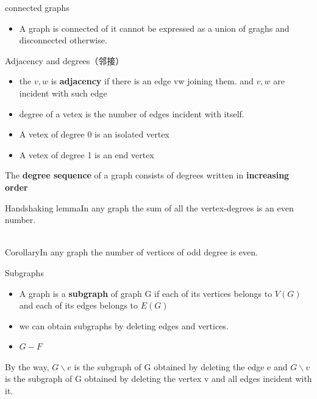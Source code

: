 \documentclass[12pt,a4paper]{ctexart}
\begin{document}
\begin{center}
    \colorbox{mygrey}{\color{myred}connected graphs}
    \begin{itemize}
        \item A graph is connected of it cannot be expressed as a union of graghs and disconnected otherwise.
    \end{itemize}
\end{center}

\begin{center}
    \colorbox{mygrey}{\color{myred}Adjacency and degrees（邻接）}
    \begin{itemize}
        \item the $v,w$ is \textbf{adjacency} if there is an edge vw joining them. and $v,w$ are incident with such edge
        \item degree of a vetex is the number of edges incident with itself.
        \item A vetex of degree 0 is an isolated vertex 
        \item A vetex of degree 1 is an end vertex 
    \end{itemize}
\end{center}
The \textbf{degree sequence} of a graph consists of degrees written in \textbf{increasing order}

\begin{center}
    \colorbox{mygrey}{\color{myred}Handshaking lemma}\colorbox{mygrey}{In any graph the sum of all the vertex-degrees}
    \colorbox{mygrey}{is an even number.~~~~~~~~~~~~~~~~~~~~~~~~~~~~~~~~~~~~~~~~~~~~~~~~~~~~~~~~~~~~~~~~~~~~~~~~~~~~~~~~~~~~~~}
\end{center}
\colorbox{mygrey}{\color{myred}Corollary}\colorbox{mygrey}{In any graph the number of vertices of odd degree is even.}
\begin{center}
    \colorbox{mygrey}{\color{myred}Subgraphs}
    \begin{itemize}
        \item A graph is a \textbf{subgraph} of graph G if each of its vertices belongs to $V(G)$ and each of its edges belongs to $E(G)$
        \item we can obtain subgraphs by deleting edges and vertices.
        \item $G-F$
    \end{itemize}
\end{center}

By the way, $G \backslash e$ is the subgraph of G obtained by deleting the edge e 
and $G \backslash v$ is the subgraph of G obtained by deleting the vertex v and all edges incident with it.
\end{document}
